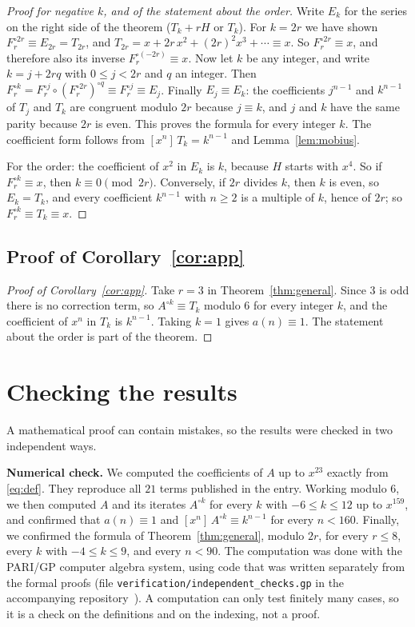 \documentclass[11pt,a4paper]{article}
\theoremstyle{definition}
\theoremstyle{remark}
\newcommand{\coeff}[2]{[x^{#1}]\,#2}
\newcommand{\para}[1]{\par\medskip\noindent\textbf{#1}\enspace}
\begin{document}
\begin{proof}[Proof for negative $k$, and of the statement about the order]
Write $E_k$ for the series on the right side of the theorem ($T_k+rH$ or $T_k$). For $k=2r$ we have shown
$F_r^{\circ 2r}\equiv E_{2r}=T_{2r}$, and $T_{2r}=x+2r\,x^2+(2r)^2x^3+\cdots\equiv x$. So $F_r^{\circ2r}\equiv x$, and
therefore also its inverse $F_r^{\circ(-2r)}\equiv x$. Now let $k$ be any integer, and write $k=j+2rq$ with
$0\le j<2r$ and $q$ an integer. Then $F_r^{\circ k}=F_r^{\circ j}\circ(F_r^{\circ 2r})^{\circ q}\equiv F_r^{\circ j}\equiv E_j$.
Finally $E_j\equiv E_k$: the coefficients $j^{n-1}$ and $k^{n-1}$ of $T_j$ and $T_k$ are congruent modulo $2r$
because $j\equiv k$, and $j$ and $k$ have the same parity because $2r$ is even. This proves the formula for every
integer $k$. The coefficient form follows from $\coeff{n}{T_k}=k^{n-1}$ and Lemma~\ref{lem:mobius}.

For the order: the coefficient of $x^2$ in $E_k$ is $k$, because $H$ starts with $x^4$. So if $F_r^{\circ k}\equiv x$,
then $k\equiv0\pmod{2r}$. Conversely, if $2r$ divides $k$, then $k$ is even, so $E_k=T_k$, and every coefficient
$k^{n-1}$ with $n\ge2$ is a multiple of $k$, hence of $2r$; so $F_r^{\circ k}\equiv T_k\equiv x$.
\end{proof}

\subsection{Proof of Corollary~\ref{cor:app}}

\begin{proof}[Proof of Corollary~\ref{cor:app}]
Take $r=3$ in Theorem~\ref{thm:general}. Since $3$ is odd there is no correction term, so $A^{\circ k}\equiv T_k$
modulo $6$ for every integer $k$, and the coefficient of $x^n$ in $T_k$ is $k^{n-1}$. Taking $k=1$ gives
$a(n)\equiv1$. The statement about the order is part of the theorem.
\end{proof}

\section{Checking the results}\label{sec:checks}

A mathematical proof can contain mistakes, so the results were checked in two independent ways.

\para{Numerical check.}
We computed the coefficients of $A$ up to $x^{23}$ exactly from \eqref{eq:def}. They reproduce all
$21$ terms published in the entry. Working modulo $6$, we then computed $A$ and its iterates $A^{\circ k}$ for every
$k$ with $-6\le k\le12$ up to $x^{159}$, and confirmed that $a(n)\equiv1$ and $\coeff{n}{A^{\circ k}}\equiv k^{n-1}$
for every $n<160$. Finally, we confirmed the formula of Theorem~\ref{thm:general}, modulo $2r$, for every $r\le8$, every
$k$ with $-4\le k\le9$, and every $n<90$.
The computation was done with the PARI/GP computer algebra system, using code that was written separately from the
formal proofs (file \texttt{verification/independent\_checks.gp} in the accompanying repository~\cite{repo}).
A computation can only test finitely many cases, so it is a check on the definitions and on the indexing, not a proof.
\end{document}
